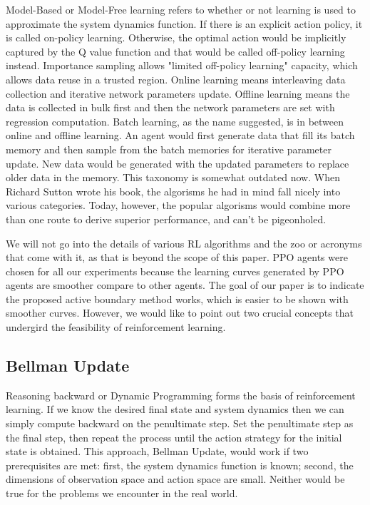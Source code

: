 \documentclass[journal]{IEEEtran}
\begin{document}
Model-Based or Model-Free learning refers to whether or not learning is used to approximate the system dynamics function. If there is an explicit action policy, it is called on-policy learning. Otherwise, the optimal action would be implicitly captured by the Q value function and that would be called off-policy learning instead. Importance sampling allows "limited off-policy learning" capacity, which allows data reuse in a trusted region. Online learning means interleaving data collection and iterative network parameters update. Offline learning means the data is collected in bulk first and then the network parameters are set with regression computation. Batch learning, as the name suggested, is in between online and offline learning. An agent would first generate data that fill its batch memory and then sample from the batch memories for iterative parameter update. New data would be generated with the updated parameters to replace older data in the memory. This taxonomy is somewhat outdated now. When Richard Sutton wrote his book, the algorisms he had in mind fall nicely into various categories. Today, however, the popular algorisms would combine more than one route to derive superior performance, and can't be pigeonholed.

We will not go into the details of various RL algorithms and the zoo or acronyms that come with it, as that is beyond the scope of this paper. PPO agents were chosen for all our experiments because the learning curves generated by PPO agents are smoother compare to other agents. The goal of our paper is to indicate the proposed active boundary method works, which is easier to be shown with smoother curves. However, we would like to point out two crucial concepts that undergird the feasibility of reinforcement learning.

\subsection{Bellman Update}

Reasoning backward or Dynamic Programming forms the basis of reinforcement learning. If we know the desired final state and system dynamics then we can simply compute backward on the penultimate step. Set the penultimate step as the final step, then repeat the process until the action strategy for the initial state is obtained. This approach, Bellman Update, would work if two prerequisites are met: first, the system dynamics function is known; second, the dimensions of observation space and action space are small. Neither would be true for the problems we encounter in the real world.
\end{document}
